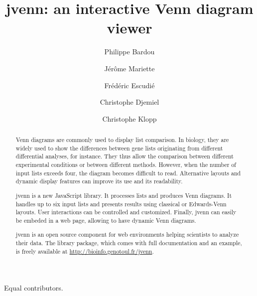 \documentclass[11pt]{bmc_article_s50}
\begin{document}
\title{jvenn: an interactive Venn diagram viewer}

\maketitle

\author[2,\dag]{Philippe Bardou}\cor{}

\author[1^{*},\dag]{J\'{e}r\^{o}me Mariette}\cor{}

\author[1]{Fr\'{e}d\'{e}ric Escudi\'{e}}

\author[1]{Christophe Djemiel}

\author[1,2]{Christophe Klopp}

\address[1]{Plate-forme bio-informatique Genotoul / MIA-T, INRA, Borde Rouge, 31326\\\hspace*{58pt} Castanet-Tolosan, France}

\address[2]{Plate-forme SIGENAE / GenPhySE, INRA, Borde Rouge, 31326 Castanet-Tolosan, France}

{\textsuperscript{\dag} Equal contributors.}

\begin{abstract}\justifying
{}
Venn diagrams are commonly used to display list comparison. In biology, they
are widely used to show the differences between gene lists originating from
different differential analyses, for instance. They thus allow the comparison
between different experimental conditions or between different methods.
However, when the number of input lists exceeds four, the diagram becomes
difficult to read. Alternative layouts and dynamic display features can improve
its use and its readability.

jvenn is a new JavaScript library. It processes lists and produces Venn diagrams.
It handles up to six input lists and presents results using classical or Edwards-Venn
layouts. User interactions can be controlled and customized. Finally, jvenn can
easily be embeded in a web page, allowing to have dynamic Venn diagrams.

jvenn is an open source component for web environments helping
scientists to analyze their data. The library package, which comes with full
documentation and an example, is freely available at
\url{http://bioinfo.genotoul.fr/jvenn}.
\end{abstract}
{\newpage}
\end{document}
